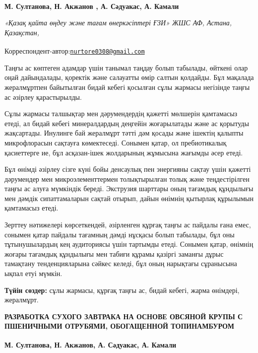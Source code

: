
\begin{articleheader}

{\bfseries
М. Султанова\authorid,
Н. Акжанов\textsuperscript{\envelope } \authorid,
А. Сәдуакас\authorid,
А. Камали\authorid}
\end{articleheader}

\begin{affiliation}
\emph{«Қазақ қайта өңдеу және тағам өнеркәсіптері ҒЗИ» ЖШС АФ, Астана, Қазақстан,}

\raggedright \textsuperscript{\envelope }Корреспондент-автор:\href{mailto:nurtore0308@gmail.com}{\nolinkurl{nurtore0308@gmail.com}}
\end{affiliation}

Таңғы ас көптеген адамдар үшін танымал таңдау болып табылады, өйткені
олар оңай дайындалады, қоректік және салауатты өмір салтын қолдайды. Бұл
мақалада жералмұртпен байытылған бидай кебегі қосылған сұлы жармасы
негізінде таңғы ас әзірлеу қарастырылды.

Сұлы жармасы талшықтар мен дәрумендердің қажетті мөлшерін қамтамасыз
етеді, ал бидай кебегі минералдардың деңгейін жоғарылатады және ас
қорытуды жақсартады. Инулинге бай жералмұрт тәтті дәм қосады және
ішектің қалыпты микрофлорасын сақтауға көмектеседі. Сонымен қатар, ол
пребиотикалық қасиеттерге ие, бұл асқазан-ішек жолдарының жұмысына
жағымды әсер етеді.

Бұл өнімді әзірлеу сізге күні бойы денсаулық пен энергияны сақтау үшін
қажетті дәрумендер мен микроэлементтермен толықтырылған толық және
теңдестірілген таңғы ас алуға мүмкіндік береді. Экструзия шарттары оның
тағамдық құндылығы мен дәмдік сипаттамаларын сақтай отырып, дайын
өнімнің қытырлақ құрылымын қамтамасыз етеді.

Зерттеу нәтижелері көрсеткендей, әзірленген құрғақ таңғы ас пайдалы ғана
емес, сонымен қатар пайдалы тағамның дәмді нұсқасы болып табылады, бұл
оны тұтынушылардың кең аудиториясы үшін тартымды етеді. Сонымен қатар,
өнімнің жоғары тағамдық құндылығы мен табиғи құрамы қазіргі заманғы
дұрыс тамақтану тенденцияларына сәйкес келеді, бұл оның нарықтағы
сұранысына ықпал етуі мүмкін.

{\bfseries Түйін сөздер:} сұлы жармасы, құрғақ таңғы ас, бидай кебегі,
жарма өнімдері, жералмұрт.

\begin{articleheader}
{\bfseries РАЗРАБОТКА СУХОГО ЗАВТРАКА НА ОСНОВЕ ОВСЯНОЙ КРУПЫ С ПШЕНИЧНЫМИ ОТРУБЯМИ, ОБОГАЩЕННОЙ ТОПИНАМБУРОМ}

{\bfseries
М. Султанова,
Н. Акжанов\textsuperscript{\envelope },
А. Сәдуакас,
А. Камали}
\end{articleheader}

